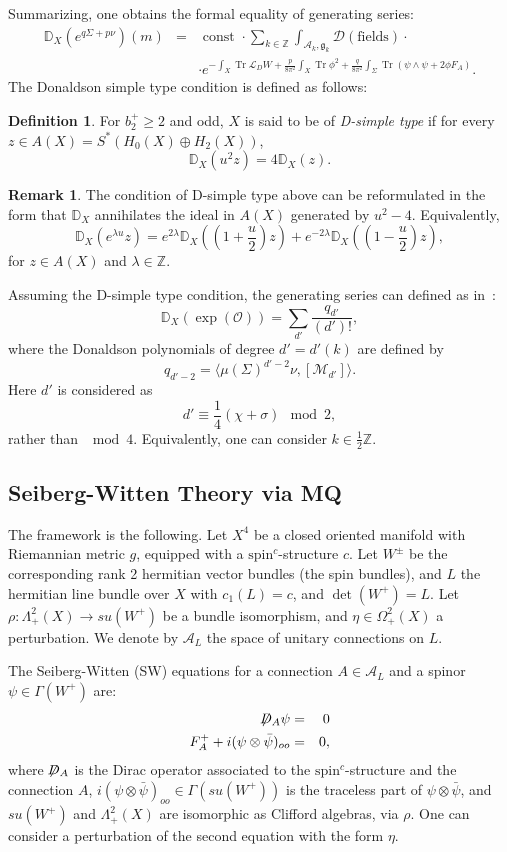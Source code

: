 \documentclass[a4paper,12pt,reqno,sumlimits]{amsart}
\theoremstyle{plain}
\theoremstyle{definition}
\newtheorem{rem}[thm]{Remark}
\newtheorem{defn}[thm]{Definition}
\newcommand{\D}{{\mathbb D}}
\newcommand{\Z}{{\mathbb Z}}
\newcommand{\1}{{\bf 1}}
\newcommand{\g}{{\mathfrak  g}}
\newcommand{\ex}[1]{{e^{#1}}}
\newcommand{\calA}{{\mathcal A}}
\newcommand{\calD}{{\mathcal D}}
\newcommand{\calM}{{\mathcal M}}
\newcommand{\calO}{{\mathcal O}}
\newcommand{\calL}{{\mathcal L}}
\renewcommand{\to}{\longrightarrow}
\newcommand{\spinc}{$\text{spin}^c$}
\newcommand{\Dirac}{\not\!\!D}
\newcommand{\Tr}{\operatorname{Tr}}
\newcommand{\ip}[1]{\langle #1 \rangle}
\numberwithin{equation}{section}
\begin{document}
Summarizing, one obtains the formal equality of generating series:
\begin{eqnarray*}
  \D_X(e^{q\Sigma+p\nu})(m)&=&\text{ const }
  \cdot\sum_{k\in\Z}\int_{\calA_k,\g_k}\calD(\text{fields})\cdot\\
  &&\cdot\ex{-\int_X\Tr{\calL_DW}+\frac{p}{8\pi^2}\int_X\Tr{\phi^2}
    +\frac{q}{8\pi^2}\int_\Sigma\Tr(\psi\wedge\psi+2\phi F_A)}.
\end{eqnarray*}
The Donaldson simple type condition is defined as follows:
\begin{defn}
  For $b_2^+\ge 2$ and odd, $X$ is said to be of {\em D-simple type}
  if for every $z\in A(X)=S^*(H_0(X)\oplus H_2(X))$,
  $$
  \D_X(u^2z)=4\D_X(z).
  $$
\end{defn}
\begin{rem}
  The condition of D-simple type above can be reformulated in the form that
  $\D_X$ annihilates the ideal in $A(X)$ generated by $u^2-4$. Equivalently,
  $$
  \D_X(e^{\lambda u}z)=e^{2\lambda}
  \D_X\left(\left(1+\frac{u}{2}\right)z\right)+
  e^{-2\lambda}
  \D_X\left(\left(1-\frac{u}{2}\right)z\right),
  $$
  for $z\in A(X)$ and $\lambda\in\Z$.
\end{rem}
Assuming the D-simple type condition, the generating series can defined as
in~\cite{km}:
$$
\D_X(\exp(\calO))=\sum_{d'}\frac{q_{d'}}{(d')!},
$$
where the Donaldson polynomials of degree $d'=d'(k)$ are defined by
$$
q_{d'-2}=\ip{\mu(\Sigma)^{d'-2}\nu,[\calM_{d'}]}.
$$
Here $d'$ is considered as
$$
d'\equiv\frac{1}{4}(\chi+\sigma)\mod 2,
$$
rather than $\mod 4$. Equivalently, one can consider $k\in\frac{1}{2}\Z$.


\subsection{Seiberg-Witten Theory via MQ}
\label{swmq}

The framework is the following. Let $X^4$ be a closed oriented manifold with
Riemannian metric $g$, equipped with a \spinc-structure $c$. Let $W^\pm$ be
the corresponding rank 2 hermitian vector bundles (the spin bundles), and $L$
the hermitian line bundle over $X$ with $c_1(L)=c$, and $\det(W^+)=L$.
Let $\rho:\Lambda^2_+(X)\to su(W^+)$ be a bundle isomorphism, and
$\eta\in\Omega^2_+(X)$ a perturbation. We denote by $\calA_L$ the space of
unitary connections on $L$.

The Seiberg-Witten (SW) equations for a connection $A\in\calA_L$ and a spinor
$\psi\in\Gamma(W^+)$ are:
\begin{eqnarray*}
  \Dirac_A\psi&=&0\\
  F_A^+ + i(\psi\otimes\bar{\psi})_{oo}&=&0,
\end{eqnarray*}
where $\Dirac_A$ is the Dirac operator associated to the \spinc-structure and
the connection $A$, $i(\psi\otimes\bar{\psi})_{oo}\in\Gamma(su(W^+))$ is the
traceless part of $\psi\otimes\bar{\psi}$, and $su(W^+)$ and $\Lambda^2_+(X)$
are isomorphic as Clifford algebras, via $\rho$.  One can consider a
perturbation of the second equation with the form $\eta$.
\end{document}
